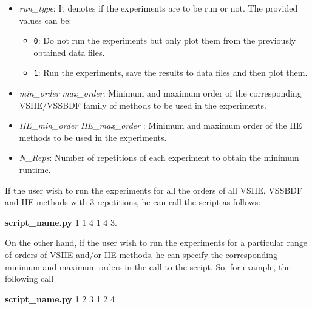 \documentclass[preprint,1p]{article}
\begin{document}
\begin{itemize}

\item {\em run\_type}: It denotes if the experiments are to be run or not. The provided values can be:
	    \begin{itemize}
			\item {\tt 0}: Do not run the experiments but only plot them from the previously obtained data files.
			\item {\tt 1}: Run the experiments, save the results to data files and then plot them.
	    \end{itemize}
\item	{\em min\_order}   {\em max\_order}: Minimum and maximum order of the corresponding VSIIE/VSSBDF family of methods 
        to be used in the experiments. 


\item	{\em IIE\_min\_order}   {\em IIE\_max\_order} : Minimum and maximum order of the IIE methods to be used in the experiments.

\item {\em N\_Reps}: Number of repetitions of each experiment to obtain the minimum runtime.	

\end{itemize}

If the user	wish to run the experiments for all the orders of all VSIIE, VSSBDF and IIE methods with 3 repetitions,
he can call the script as follows: 

\begin{center}
{\bf script\_name.py} \hspace{2mm} 1\hspace{2mm} 1 \hspace{2mm} 4 \hspace{2mm} 1 \hspace{2mm} 4 \hspace{2mm} 3.
\end{center}

On the other hand, if the user wish to run the experiments for a particular range of orders of VSIIE and/or IIE methods,
he can specify the corresponding minimum and maximum orders in the call to the script.
So, for example, the following call


\begin{center}
{\bf script\_name.py} \hspace{2mm} 1 \hspace{2mm} 2 \hspace{2mm} 3 \hspace{2mm} 1 \hspace{2mm} 2 \hspace{2mm} 4	
\end{center}
\end{document}

